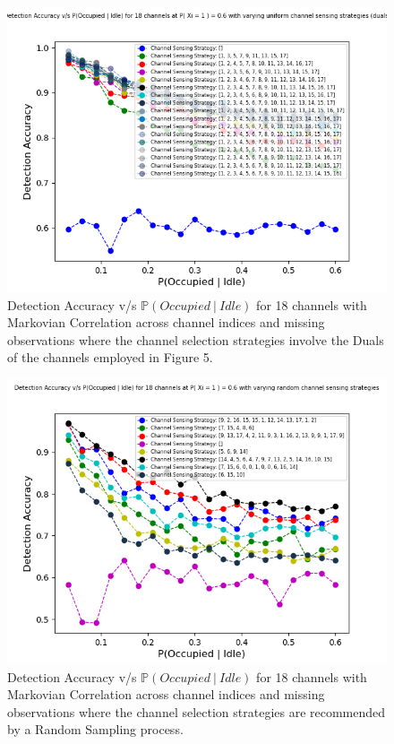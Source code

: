 \documentclass[12pt, draftcls, onecolumn]{IEEEtran}
\begin{document}
\begin{figure}[t]
\includegraphics[width=1.0\textwidth]{Uniform_Channel_Sensing_Duals.png}
\caption{Detection Accuracy v/s $\mathbb P(Occupied\ |\ Idle)$ for 18 channels with Markovian Correlation across channel indices and missing observations where the channel selection strategies involve the Duals of the channels employed in Figure 5.}
\label{fig:mesh6}
\centering
\end{figure}
\begin{figure}[t]
\includegraphics[width=1.0\textwidth]{Random_Channel_Sensing.png}
\caption{Detection Accuracy v/s $\mathbb P(Occupied\ |\ Idle)$ for 18 channels with Markovian Correlation across channel indices and missing observations where the channel selection strategies are recommended by a Random Sampling process.}
\label{fig:mesh7}
\centering
\end{figure}
\end{document}
